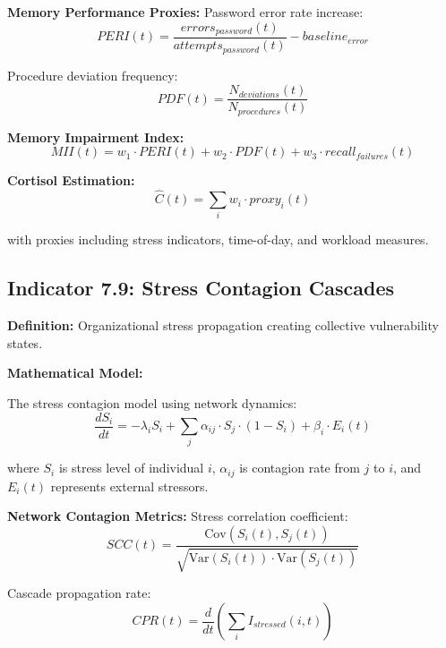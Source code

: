 \documentclass[11pt,a4paper]{article}
\begin{document}
\textbf{Memory Performance Proxies:}
Password error rate increase:
\begin{equation}
PERI(t) = \frac{errors_{password}(t)}{attempts_{password}(t)} - baseline_{error}
\end{equation}

Procedure deviation frequency:
\begin{equation}
PDF(t) = \frac{N_{deviations}(t)}{N_{procedures}(t)}
\end{equation}

\textbf{Memory Impairment Index:}
\begin{equation}
MII(t) = w_1 \cdot PERI(t) + w_2 \cdot PDF(t) + w_3 \cdot recall_{failures}(t)
\end{equation}

\textbf{Cortisol Estimation:}
\begin{equation}
\hat{C}(t) = \sum_{i} w_i \cdot proxy_i(t)
\end{equation}

with proxies including stress indicators, time-of-day, and workload measures.

\subsection{Indicator 7.9: Stress Contagion Cascades}

\textbf{Definition:} Organizational stress propagation creating collective vulnerability states.

\textbf{Mathematical Model:}

The stress contagion model using network dynamics:
\begin{equation}
\frac{dS_i}{dt} = -\lambda_i S_i + \sum_{j} \alpha_{ij} \cdot S_j \cdot (1-S_i) + \beta_i \cdot E_i(t)
\end{equation}

where $S_i$ is stress level of individual $i$, $\alpha_{ij}$ is contagion rate from $j$ to $i$, and $E_i(t)$ represents external stressors.

\textbf{Network Contagion Metrics:}
Stress correlation coefficient:
\begin{equation}
SCC(t) = \frac{\text{Cov}(S_i(t), S_j(t))}{\sqrt{\text{Var}(S_i(t)) \cdot \text{Var}(S_j(t))}}
\end{equation}

Cascade propagation rate:
\begin{equation}
CPR(t) = \frac{d}{dt}\left(\sum_{i} I_{stressed}(i,t)\right)
\end{equation}
\end{document}

